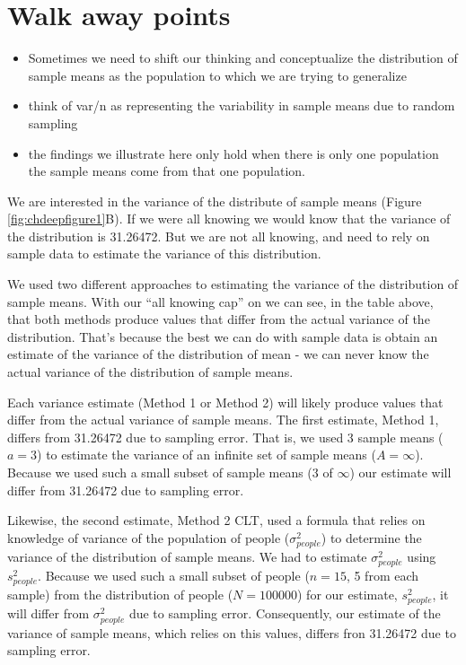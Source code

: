 \documentclass[
]{krantz}
\providecommand{\tightlist}{%
  \setlength{\itemsep}{0pt}\setlength{\parskip}{0pt}}
\begin{document}
\hypertarget{walk-away-points}{%
\section{Walk away points}\label{walk-away-points}}

\begin{itemize}
\tightlist
\item
  Sometimes we need to shift our thinking and conceptualize the distribution of sample means as the population to which we are trying to generalize
\item
  think of var/n as representing the variability in sample means due to random sampling
\item
  the findings we illustrate here only hold when there is only one population the sample means come from that one population.
\end{itemize}

We are interested in the variance of the distribute of sample means (Figure \ref{fig:chdeepfigure1}B). If we were all knowing we would know that the variance of the distribution is 31.26472. But we are not all knowing, and need to rely on sample data to estimate the variance of this distribution.

We used two different approaches to estimating the variance of the distribution of sample means. With our ``all knowing cap'' on we can see, in the table above, that both methods produce values that differ from the actual variance of the distribution. That's because the best we can do with sample data is obtain an estimate of the variance of the distribution of mean - we can never know the actual variance of the distribution of sample means.

Each variance estimate (Method 1 or Method 2) will likely produce values that differ from the actual variance of sample means. The first estimate, Method 1, differs from 31.26472 due to sampling error. That is, we used 3 sample means (\(a=3\)) to estimate the variance of an infinite set of sample means (\(A = \infty\)). Because we used such a small subset of sample means (3 of \(\infty\)) our estimate will differ from 31.26472 due to sampling error.

Likewise, the second estimate, Method 2 CLT, used a formula that relies on knowledge of variance of the population of people (\(\sigma_{people}^2\)) to determine the variance of the distribution of sample means. We had to estimate \(\sigma_{people}^2\) using \(s_{people}^2\). Because we used such a small subset of people (\(n = 15\), 5 from each sample) from the distribution of people (\(N = 100000\)) for our estimate, \(s_{people}^2\), it will differ from \(\sigma_{people}^2\) due to sampling error. Consequently, our estimate of the variance of sample means, which relies on this values, differs fron 31.26472 due to sampling error.
\end{document}
